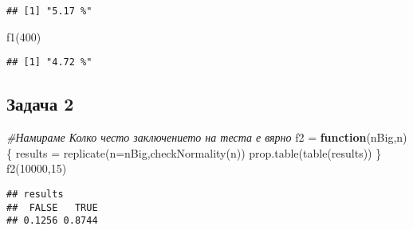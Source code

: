 \documentclass[
]{article}
\newenvironment{Shaded}{\begin{snugshade}}{\end{snugshade}}
\newcommand{\AttributeTok}[1]{\textcolor[rgb]{0.77,0.63,0.00}{#1}}
\newcommand{\CommentTok}[1]{\textcolor[rgb]{0.56,0.35,0.01}{\textit{#1}}}
\newcommand{\ControlFlowTok}[1]{\textcolor[rgb]{0.13,0.29,0.53}{\textbf{#1}}}
\newcommand{\DecValTok}[1]{\textcolor[rgb]{0.00,0.00,0.81}{#1}}
\newcommand{\FloatTok}[1]{\textcolor[rgb]{0.00,0.00,0.81}{#1}}
\newcommand{\FunctionTok}[1]{\textcolor[rgb]{0.00,0.00,0.00}{#1}}
\newcommand{\NormalTok}[1]{#1}
\newcommand{\OtherTok}[1]{\textcolor[rgb]{0.56,0.35,0.01}{#1}}
\newcommand{\SpecialCharTok}[1]{\textcolor[rgb]{0.00,0.00,0.00}{#1}}
\begin{document}
\begin{verbatim}
## [1] "5.17 %"
\end{verbatim}

\begin{Shaded}
\begin{Highlighting}[]
\FunctionTok{f1}\NormalTok{(}\DecValTok{400}\NormalTok{)}
\end{Highlighting}
\end{Shaded}

\begin{verbatim}
## [1] "4.72 %"
\end{verbatim}

\hypertarget{ux437ux430ux434ux430ux447ux430-2}{%
\subsection{\texorpdfstring{\textbf{Задача
2}}{Задача 2}}\label{ux437ux430ux434ux430ux447ux430-2}}

\begin{Shaded}
\end{Shaded}

\begin{Shaded}
\begin{Highlighting}[]
\CommentTok{\#Намираме  Колко често заключението на теста е вярно }
\NormalTok{f2 }\OtherTok{=} \ControlFlowTok{function}\NormalTok{(nBig,n)\{}
\NormalTok{  results }\OtherTok{=} \FunctionTok{replicate}\NormalTok{(}\AttributeTok{n=}\NormalTok{nBig,}\FunctionTok{checkNormality}\NormalTok{(n))}
  \FunctionTok{prop.table}\NormalTok{(}\FunctionTok{table}\NormalTok{(results))}
\NormalTok{\}}
\FunctionTok{f2}\NormalTok{(}\DecValTok{10000}\NormalTok{,}\DecValTok{15}\NormalTok{)}
\end{Highlighting}
\end{Shaded}

\begin{verbatim}
## results
##  FALSE   TRUE 
## 0.1256 0.8744
\end{verbatim}
\end{document}
